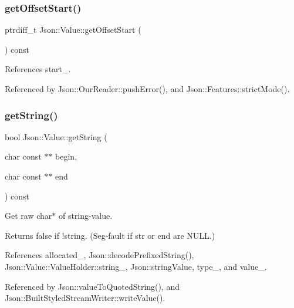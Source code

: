 \subsubsection{\texorpdfstring{get\+Offset\+Start()}{getOffsetStart()}}
{\footnotesize\ttfamily ptrdiff\+\_\+t Json\+::\+Value\+::get\+Offset\+Start (\begin{DoxyParamCaption}{ }\end{DoxyParamCaption}) const}



References start\+\_\+.



Referenced by Json\+::\+Our\+Reader\+::push\+Error(), and Json\+::\+Features\+::strict\+Mode().

\mbox{\label{classJson_1_1Value_a2e1b7be6bde2fe23f15290d9ddbbdf8a_a2e1b7be6bde2fe23f15290d9ddbbdf8a}} 
\subsubsection{\texorpdfstring{get\+String()}{getString()}}
{\footnotesize\ttfamily bool Json\+::\+Value\+::get\+String (\begin{DoxyParamCaption}\item[{char const $\ast$$\ast$}]{begin,  }\item[{char const $\ast$$\ast$}]{end }\end{DoxyParamCaption}) const}

Get raw char$\ast$ of string-\/value. \begin{DoxyReturn}{Returns}
false if !string. (Seg-\/fault if str or end are N\+U\+LL.) 
\end{DoxyReturn}


References allocated\+\_\+, Json\+::decode\+Prefixed\+String(), Json\+::\+Value\+::\+Value\+Holder\+::string\+\_\+, Json\+::string\+Value, type\+\_\+, and value\+\_\+.



Referenced by Json\+::value\+To\+Quoted\+String(), and Json\+::\+Built\+Styled\+Stream\+Writer\+::write\+Value().

\mbox{\label{classJson_1_1Value_a65d8e3ab6a5871cbd019a3e0f0b944a3_a65d8e3ab6a5871cbd019a3e0f0b944a3}} 
